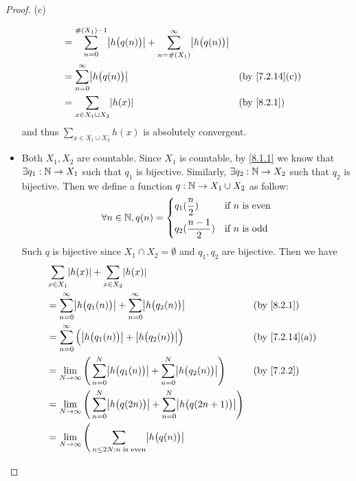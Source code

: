\begin{proof}{(c)}
\begin{itemize}
\begin{align*}
			       & = \sum_{n = 0}^{\#(X_1) - 1} \abs{h\big(q(n)\big)} + \sum_{n = \#(X_1)}^\infty \abs{h\big(q(n)\big)}                                   \\
			       & = \sum_{n = 0}^\infty \abs{h\big(q(n)\big)}                                                          &  & \text{(by \cref{7.2.14}(c))} \\
			       & = \sum_{x \in X_1 \cup X_2} \abs{h(x)}                                                               &  & \by{8.2.1}
		      \end{align*}
		      and thus \(\sum_{x \in X_1 \cup X_2} h(x)\) is absolutely convergent.
		\item Both \(X_1, X_2\) are countable.
		      Since \(X_1\) is countable, by \cref{8.1.1} we know that \(\exists q_1 : \mathbb{N} \to X_1\) such that \(q_1\) is bijective.
		      Similarly, \(\exists q_2 : \mathbb{N} \to X_2\) such that \(q_2\) is bijective.
		      Then we define a function \(q : \mathbb{N} \to X_1 \cup X_2\) as follow:
		      \[
			      \forall n \in \mathbb{N}, q(n) = \begin{dcases}
				      q_1(\dfrac{n}{2})     & \text{if } n \text{ is even} \\
				      q_2(\dfrac{n - 1}{2}) & \text{if } n \text{ is odd}
			      \end{dcases}
		      \]
		      Such \(q\) is bijective since \(X_1 \cap X_2 = \emptyset\) and \(q_1, q_2\) are bijective.
		      Then we have
		      \begin{align*}
			       & \sum_{x \in X_1} \abs{h(x)} + \sum_{x \in X_2} \abs{h(x)}                                                                                             \\
			       & = \sum_{n = 0}^\infty \abs{h\big(q_1(n)\big)} + \sum_{n = 0}^\infty \abs{h\big(q_2(n)\big)}                         &  & \by{8.2.1}                   \\
			       & = \sum_{n = 0}^\infty \Big(\abs{h\big(q_1(n)\big)} + \abs{h\big(q_2(n)\big)}\Big)                                   &  & \text{(by \cref{7.2.14}(a))} \\
			       & = \lim_{N \to \infty} \Bigg(\sum_{n = 0}^N \abs{h\big(q_1(n)\big)} + \sum_{n = 0}^N \abs{h\big(q_2(n)\big)}\Bigg)   &  & \by{7.2.2}                   \\
			       & = \lim_{N \to \infty} \Bigg(\sum_{n = 0}^N \abs{h\big(q(2n)\big)} + \sum_{n = 0}^N \abs{h\big(q(2n + 1)\big)}\Bigg)                                   \\
			       & = \lim_{N \to \infty} \Bigg(\sum_{n \leq 2N : n \text{ is even}} \abs{h\big(q(n)\big)}                                                                \\

\end{align*}
\end{itemize}
\end{proof}
